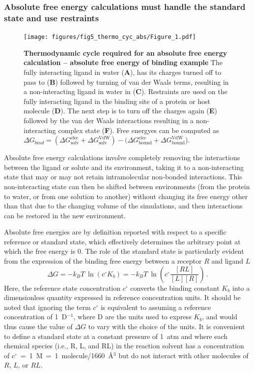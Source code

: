 \documentclass[9pt,bestpractices]{livecoms}
\begin{document}
\subsubsection{Absolute free energy calculations must handle the standard state and use restraints}
\label{sec:standardstate-restraints}

\begin{figure}
    \texttt{[image: figures/fig5\_thermo\_cyc\_abs/Figure\_1.pdf]}
    \caption{\textbf{Thermodynamic cycle required for an absolute free energy calculation -- absolute free energy of binding example} The fully interacting ligand in water (\textbf{A}), has its charges turned off to pass to (\textbf{B}) followed by turning of van der Waals terms, resulting in a non-interacting ligand in water in (\textbf{C}). Restraints are used on the fully interacting ligand in the binding site of a protein or host molecule (\textbf{D}). The next step is to turn off the charges again (\textbf{E}) followed by the van der Waals interactions resulting in a non-interacting complex state (\textbf{F}). Free energyes can be computed as $\Delta G_{bind} = (\Delta G^{\mathrm{elec}}_{\mathrm{solv}}+ \Delta G^{\mathrm{VdW}}_{\mathrm{solv}})-(\Delta G^{\mathrm{elec}}_{\mathrm{bound}}+ \Delta G^{\mathrm{VdW}}_{\mathrm{bound}}$).
    }
    \label{fig:fig_absolute_thermodynamic_cycle}
\end{figure}

Absolute free energy calculations involve completely removing the interactions between the ligand or solute and its environment, taking it to a non-interacting state that may or may not retain intramolecular non-bonded interactions.
This non-interacting state can then be shifted between environments (from the protein to water, or from one solution to another) without changing its free energy other than that due to the changing volume of the simulations, and then interactions can be restored in the new environment.

Absolute free energies are by definition reported with respect to a specific reference or standard state, which effectively determines the arbitrary point at which the free energy is 0.
The role of the standard state is particularly evident from the expression of the binding free energy between a receptor $R$ and ligand $L$
\begin{equation} \label{eq:DGfromKAB}
    \Delta G = -k_BT ~ \ln \left( c^{\circ} K_b \right)  = -k_BT ~ \ln\left( c^{\circ} \frac{[RL]}{[L][R]} \right) \, .
\end{equation}
Here, the reference state concentration $c^{\circ}$ converts the binding constant $K_b$ into a dimensionless quantity expressed in reference concentration units.
It should be noted that ignoring the term $c^{\circ}$ is equivalent to assuming a reference concentration of 1~D$^{-1}$, where D are the units used to express $K_b$, and would thus cause the value of $\Delta G$ to vary with the choice of the units.
It is convenient to define a standard state at a constant pressure of 1~atm and where each chemical species (i.e., R, L, and RL) in the reaction solvent has a concentration of $c^{\circ}$~=~1~M~=~1~molecule/1660~\r{A}$^3$ but do not interact with other molecules of $R$, $L$, or $RL$.
\end{document}
